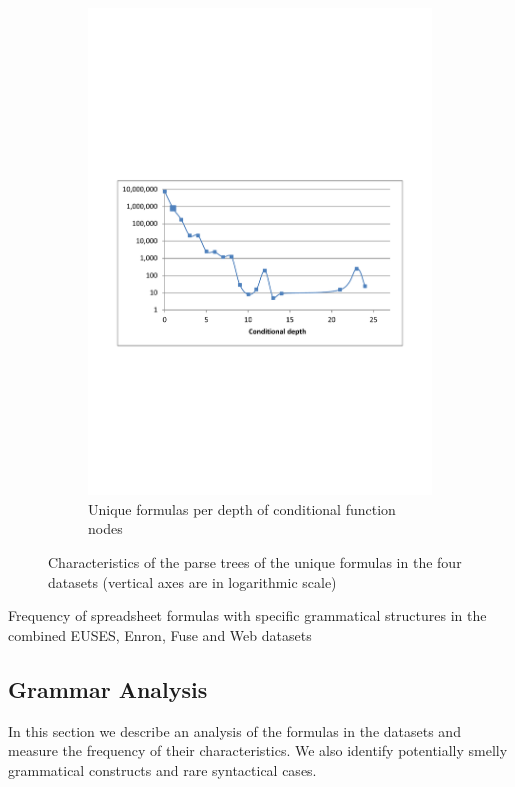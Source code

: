 \documentclass[times]{smrauth}
\begin{document}
\begin{figure}
\begin{subfigure}[b]{0.49\textwidth}
		\includegraphics[width=1\textwidth]{img/depths4}
		\caption{Unique formulas per depth of conditional function nodes}
		\label{fig:depthConditional}
	\end{subfigure}
	\caption{Characteristics of the parse trees of the unique formulas in the four datasets (vertical axes are in logarithmic scale)}\label{Figure:depths}
\end{figure}

\begin{table}
	\vspace{2mm}
	\caption{Frequency of spreadsheet formulas with specific grammatical structures in the combined EUSES, Enron, Fuse and Web datasets}
	\label{table:occurences}
	\centering
	
\end{table}

\subsection{Grammar Analysis}
\label{subsection:grammarAnalysis}
In this section we describe an analysis of the formulas in the datasets and measure the frequency of their characteristics. We also identify potentially smelly grammatical constructs and rare syntactical cases.
\end{document}
